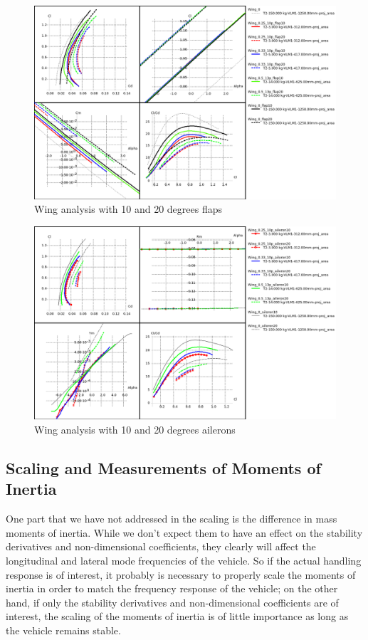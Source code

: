 \documentclass[titlepage,10pt]{article}
\begin{document}
\begin{figure}[htbp]
\begin{center}
\includegraphics[width=120mm]{scale_tc_flaps.png}
\caption{Wing analysis with 10 and 20 degrees flaps}
\label{fig:tcflaps}
\end{center}
\end{figure}
\begin{figure}[htb]
\begin{center}
\includegraphics[width=120mm]{scale_tc_ailerons.png}
\caption{Wing analysis with 10 and 20 degrees ailerons}
\label{fig:tcailerons}
\end{center}
\end{figure}
\clearpage
\newpage

\subsection{Scaling and Measurements of Moments of Inertia}
One part that we have not addressed in the scaling is the difference in mass moments of inertia. While we don't expect them to have an effect on the stability derivatives and non-dimensional coefficients, they clearly will affect the longitudinal and lateral mode frequencies of the vehicle. So if the actual handling response is of interest, it probably is necessary to properly scale the moments of inertia in order to match the frequency response of the vehicle; on the other hand, if only the stability derivatives and non-dimensional coefficients are of interest, the scaling of the moments of inertia is of little importance as long as the vehicle remains stable.\\
\end{document}
